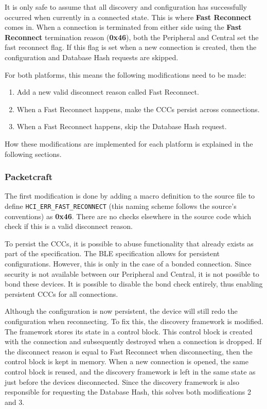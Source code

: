 It is only safe to assume that all discovery and configuration has successfully occurred when currently in a connected state. This is where \textbf{Fast Reconnect} comes in. When a connection is terminated from either side using the \textbf{Fast Reconnect} termination reason (\textbf{0x46}), both the Peripheral and Central set the fast reconnect flag. If this flag is set when a new connection is created, then the configuration and Database Hash requests are skipped. 

For both platforms, this means the following modifications need to be made:
\begin{enumerate}
    \item Add a new valid disconnect reason called Fast Reconnect.
    \item When a Fast Reconnect happens, make the CCCs persist across connections.
    \item When a Fast Reconnect happens, skip the Database Hash request.
\end{enumerate}
How these modifications are implemented for each platform is explained in the following sections.

\subsubsection{Packetcraft}
The first modification is done by adding a macro definition to the source file to define \texttt{HCI\_ERR\_FAST\_RECONNECT} (this naming scheme follows the source's conventions) as \textbf{0x46}. There are no checks elsewhere in the source code which check if this is a valid disconnect reason.

To persist the CCCs, it is possible to abuse functionality that already exists as part of the specification. The BLE specification allows for persistent configurations. However, this is only in the case of a bonded connection. Since security is not available between our Peripheral and Central, it is not possible to bond these devices. It is possible to disable the bond check entirely, thus enabling persistent CCCs for all connections.

Although the configuration is now persistent, the device will still redo the configuration when reconnecting. To fix this, the discovery framework is modified. The framework stores its state in a control block. This control block is created with the connection and subsequently destroyed when a connection is dropped. If the disconnect reason is equal to Fast Reconnect when disconnecting, then the control block is kept in memory. When a new connection is opened, the same control block is reused, and the discovery framework is left in the same state as just before the devices disconnected. Since the discovery framework is also responsible for requesting the Database Hash, this solves both modifications 2 and 3.

